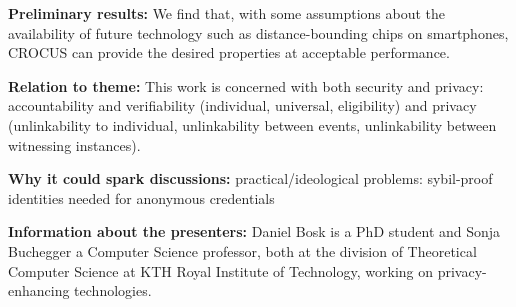 \textbf{Preliminary results:} We find that, with some
 assumptions about the availability of future technology such as
 distance-bounding chips on smartphones, CROCUS can provide the
 desired properties at acceptable performance.

\textbf{Relation to theme:} This work is concerned with both security
and privacy: accountability and verifiability (individual, universal, eligibility) and
privacy (unlinkability to individual, unlinkability between events,
unlinkability between witnessing instances). 


\textbf{Why it could spark discussions:}
practical/ideological problems: sybil-proof identities needed for anonymous
credentials

\textbf{Information about the presenters:} Daniel Bosk is a PhD
student and Sonja Buchegger a Computer Science professor, both at the
division of Theoretical Computer Science at KTH Royal Institute of
Technology, working on privacy-enhancing technologies.